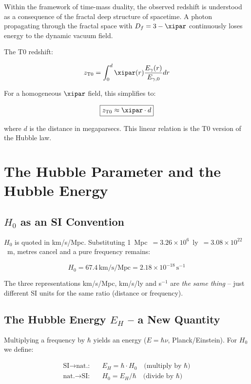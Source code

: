 Within the framework of time-mass duality, the observed redshift is 
understood as a consequence of the fractal deep structure of spacetime. A 
photon propagating through the fractal space with $D_f = 3 - \xipar$ 
continuously loses energy to the dynamic vacuum field.

The T0 redshift:

\begin{equation}
z_{\text{T0}} = \int_0^d \xipar(r) \frac{E_\gamma(r)}{E_{\gamma,0}} dr
\end{equation}

For a homogeneous $\xipar$ field, this simplifies to:

\begin{equation}
\boxed{z_{\text{T0}} \approx \xipar \cdot d}
\label{eq:z_T0_linear}
\end{equation}

where $d$ is the distance in megaparsecs. This linear relation is the 
T0 version of the Hubble law.

\section{The Hubble Parameter and the Hubble Energy}

\subsection{$H_0$ as an SI Convention}

$H_0$ is quoted in km/s/Mpc. Substituting 
1~Mpc~$= 3.26 \times 10^6$~ly~$= 3.08 \times 10^{22}$~m, 
metres cancel and a pure frequency remains:

\begin{equation}
H_0 = 67.4\,\text{km/s/Mpc} = 2.18 \times 10^{-18}\,\text{s}^{-1}
\end{equation}

The three representations km/s/Mpc, km/s/ly and s$^{-1}$ are 
\emph{the same thing} -- just different SI units for the same 
ratio (distance or frequency).

\subsection{The Hubble Energy $E_H$ -- a New Quantity}

Multiplying a frequency by $\hbar$ yields an energy 
($E = \hbar\nu$, Planck/Einstein). For $H_0$ we define:

\begin{align}
\text{SI} \to \text{nat.:} \quad & E_H = \hbar \cdot H_0 
\quad\text{(multiply by $\hbar$)} \\
\text{nat.} \to \text{SI:} \quad & H_0 = E_H / \hbar
\quad\text{(divide by $\hbar$)}
\end{align}

